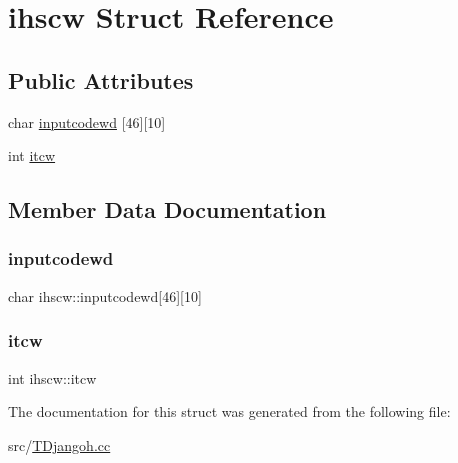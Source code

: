 \hypertarget{structihscw}{}\section{ihscw Struct Reference}
\label{structihscw}
\subsection*{Public Attributes}
\begin{DoxyCompactItemize}
\item 
char \hyperlink{structihscw_a5d2914654dad446b9a18843c9ba12096}{inputcodewd} \mbox{[}46\mbox{]}\mbox{[}10\mbox{]}
\item 
int \hyperlink{structihscw_a2589565b82765759f63bcb4cbd218c2a}{itcw}
\end{DoxyCompactItemize}


\subsection{Member Data Documentation}
\mbox{\label{structihscw_a5d2914654dad446b9a18843c9ba12096}} 
\subsubsection{\texorpdfstring{inputcodewd}{inputcodewd}}
{\footnotesize\ttfamily char ihscw\+::inputcodewd\mbox{[}46\mbox{]}\mbox{[}10\mbox{]}}

\mbox{\label{structihscw_a2589565b82765759f63bcb4cbd218c2a}} 
\subsubsection{\texorpdfstring{itcw}{itcw}}
{\footnotesize\ttfamily int ihscw\+::itcw}



The documentation for this struct was generated from the following file\+:\begin{DoxyCompactItemize}
\item 
src/\hyperlink{_t_djangoh_8cc}{T\+Djangoh.\+cc}\end{DoxyCompactItemize}
